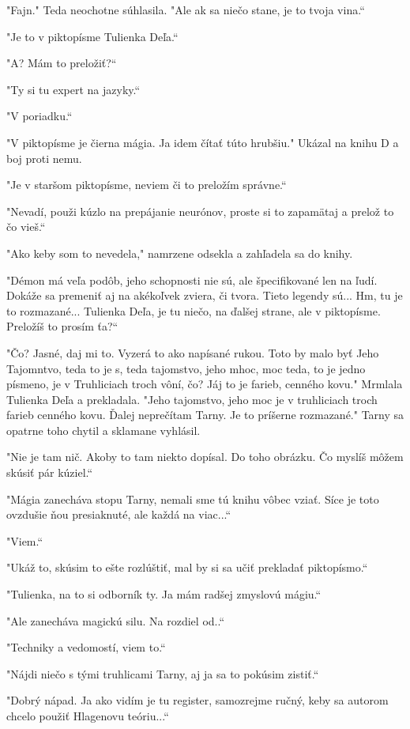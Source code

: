 \documentclass{book}
\begin{document}
"$ $Fajn."$ $ Teda neochotne súhlasila. "$ $Ale ak sa niečo stane, je to tvoja vina.“

"$ $Je to v piktopísme Tulienka Deľa.“

"$ $A? Mám to preložiť?“

"$ $Ty si tu expert na jazyky.“

"$ $V poriadku.“

"$ $V piktopísme je čierna mágia. Ja idem čítať túto hrubšiu."$ $ Ukázal na knihu D a boj proti nemu.

"$ $Je v staršom piktopísme, neviem či to preložím správne.“

"$ $Nevadí, použi kúzlo na prepájanie neurónov, proste si to zapamätaj a prelož to čo vieš.“

"$ $Ako keby som to nevedela,"$ $ namrzene odsekla a zahľadela sa do knihy.

"$ $Démon má veľa podôb, jeho schopnosti nie sú, ale špecifikované len na ľudí. Dokáže sa premeniť aj na akékoľvek zviera, či tvora. Tieto legendy sú... Hm, tu je to rozmazané... Tulienka Deľa, je tu niečo, na ďalšej strane, ale v piktopísme. Preložíš to prosím ťa?“

"$ $Čo? Jasné, daj mi to. Vyzerá to ako napísané rukou. Toto by malo byť Jeho Tajomntvo, teda to je s, teda tajomstvo, jeho mhoc, moc teda, to je jedno písmeno, je v Truhliciach troch vôní, čo? Jáj to je farieb, cenného kovu."$ $ Mrmlala Tulienka Deľa a prekladala. "$ $Jeho tajomstvo, jeho moc je v truhliciach troch farieb cenného kovu. Ďalej neprečítam Tarny. Je to príšerne rozmazané."$ $ Tarny sa opatrne toho chytil a sklamane vyhlásil.

"$ $Nie je tam nič. Akoby to tam niekto dopísal. Do toho obrázku. Čo myslíš môžem skúsiť pár kúziel.“

"$ $Mágia zanecháva stopu Tarny, nemali sme tú knihu vôbec vziať. Síce je toto ovzdušie ňou presiaknuté, ale každá na viac...“

"$ $Viem.“

"$ $Ukáž to, skúsim to ešte rozlúštiť, mal by si sa učiť prekladať piktopísmo.“

"$ $Tulienka, na to si odborník ty. Ja mám radšej zmyslovú mágiu.“

"$ $Ale zanecháva magickú silu. Na rozdiel od..“

"$ $Techniky a vedomostí, viem to.“

"$ $Nájdi niečo s tými truhlicami Tarny, aj ja sa to pokúsim zistiť.“

"$ $Dobrý nápad. Ja ako vidím je tu register, samozrejme ručný, keby sa autorom chcelo použiť Hlagenovu teóriu...“
\end{document}
